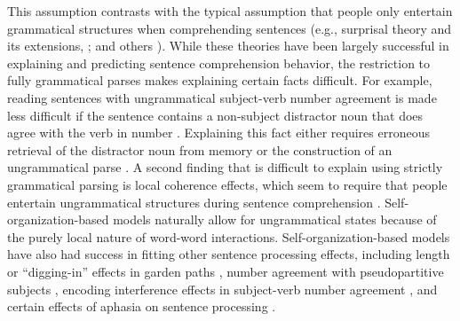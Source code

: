 \documentclass[a4paper, 12pt]{article}
\begin{document}
This assumption contrasts with the typical assumption that people
only entertain grammatical structures when comprehending sentences (e.g.,
surprisal theory and its extensions, \citealt{hale2001probabilistic,
    levy2008expectation, levy2008noisy, futrell2017noisy, futrell2020lossy};
and others \citealt{gibson2006interaction, hale2011what}). While these theories
have been largely successful in explaining and predicting sentence
comprehension behavior, the restriction to fully grammatical parses makes
explaining certain facts difficult. For example, reading sentences with
ungrammatical subject-verb number agreement is made less difficult if the sentence
contains a non-subject distractor noun that does agree with the verb in number
\citep{dillon2013contrasting, lago2015agreement, wagers2009agreement,
    pearlmutter1999agreement}. Explaining this fact either requires erroneous retrieval of the
distractor noun from memory \citep{jaeger2017similarity, lewis2005activation,
vasishth2019computational} or the construction of an ungrammatical parse
\citep{smith2018self, smith2021encoding}. A second finding that is difficult to
explain using strictly grammatical parsing is local coherence effects, which
seem to require that people entertain ungrammatical structures during sentence
comprehension \citep{tabor2004effects,
    paape2015local, konieczny2005psychological, konieczny2009local}.
Self-organization-based models naturally allow for ungrammatical states because
of the purely local nature of word-word interactions.
Self-organization-based models have also had success in fitting other sentence
processing effects, including length or ``digging-in'' effects in garden paths
\citep{tabor2004evidence}, number agreement with pseudopartitive subjects
\citep{smith2018self}, encoding interference effects in subject-verb number
agreement \citep{smith2021encoding}, and certain effects of aphasia on sentence processing 
\citep{kempen1989incremental, vosse2000syntactic, vosse2009unification}.%
\end{document}
